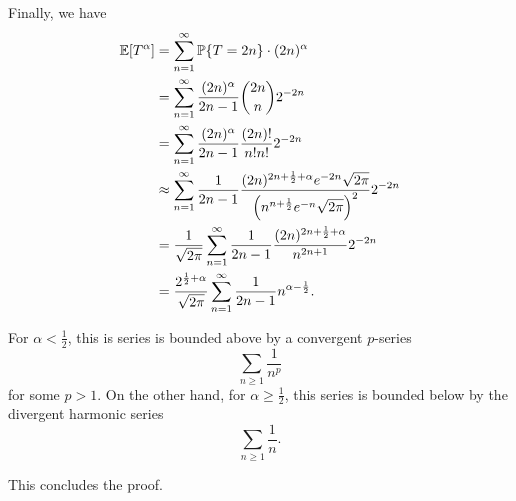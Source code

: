 \documentclass[10pt]{article}
\DeclarePairedDelimiter{\set}{\lbrace}{\rbrace}
\newcommand{\E}{\mathbb{E}}
\renewcommand{\P}{\mathbb{P}}
\begin{document}
Finally,
we have
\begin{align*}
  \E[T^\alpha]
  &= \sum_{n=1}^\infty \P\set{T=2n}\cdot (2n)^\alpha \\
  &= \sum_{n=1}^\infty \frac{(2n)^\alpha}{2n-1} \binom{2n}{n} 2^{-2n} \\
  &= \sum_{n=1}^\infty \frac{(2n)^\alpha}{2n-1} \frac{(2n)!}{n!n!} 2^{-2n} \\
  &\approx \sum_{n=1}^\infty \frac1{2n-1} \frac{(2n)^{2n+\frac12+\alpha} e^{-2n} \sqrt{2\pi}}{\left( n^{n+\frac12} e^{-n} \sqrt{2\pi} \right)^2} 2^{-2n} \\
  &= \frac1{\sqrt{2\pi}} \sum_{n=1}^\infty \frac1{2n-1} \frac{(2n)^{2n+\frac12+\alpha}}{n^{2n+1}} 2^{-2n} \\
  &= \frac{2^{\frac12+\alpha}}{\sqrt{2\pi}} \sum_{n=1}^\infty \frac1{2n-1} n^{\alpha-\frac12}.
\end{align*}

For $\alpha < \frac12$,
this is series is bounded above by a convergent $p$-series
\[
  \sum_{n\geq 1} \frac1{n^p}
\]
for some $p > 1$.
On the other hand,
for $\alpha \geq \frac12$,
this series is bounded below by the divergent harmonic series
\[
  \sum_{n\geq 1} \frac1n.
\]

This concludes the proof.

\clearpage
\section{}
\section{}
\section{}
\section{}
\end{document}
